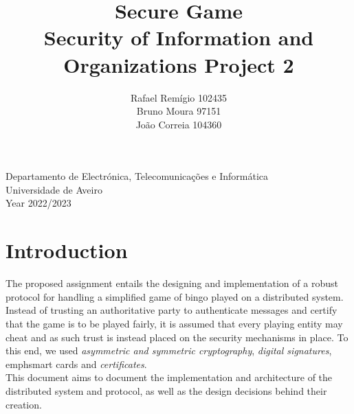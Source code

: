 \documentclass[11pt]{article}
\begin{document}
\begin{titlepage}

\title{%
  Secure Game \\
  \large  Security of Information and Organizations Project 2\\}

\author{Rafael Remígio 102435 \\ Bruno Moura 97151\\ João Correia 104360}

\maketitle

\vfill
\begin{center}

	Departamento de Electrónica, Telecomunicações e Informática\\
       Universidade de Aveiro\\ Year 2022/2023
\end{center}



\end{titlepage}

\tableofcontents

\clearpage

\section{Introduction}
The proposed assignment entails the designing and implementation of a robust protocol for handling a simplified game of bingo played on a distributed system. 
\\ Instead of trusting an authoritative party to authenticate messages and certify that the game is to be played fairly, it is assumed that every playing entity may cheat and as such trust is instead placed on the security mechanisms in place. To this end, we used \emph{asymmetric and symmetric cryptography}, \emph{digital signatures}, emph{smart cards} and \emph{certificates}.
\\This document aims to document the implementation and architecture of the distributed system and protocol, as well as the design decisions behind their creation.

\pagebreak
\end{document}
